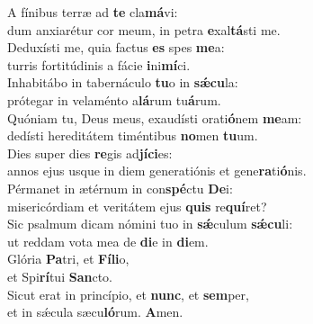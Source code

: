 \evenverse A fínibus terræ ad \textbf{te} cla\textbf{má}vi:~\*\\
\evenverse dum anxiarétur cor meum, in petra \textbf{e}xal\textbf{tá}sti me.\\
\oddverse Deduxísti me, quia factus \textbf{es} spes \textbf{me}a:~\*\\
\oddverse turris fortitúdinis a fácie \textbf{i}ni\textbf{mí}ci.\\
\evenverse Inhabitábo in tabernáculo \textbf{tu}o in \textbf{sǽ}\textbf{cu}la:~\*\\
\evenverse prótegar in velaménto a\textbf{lá}rum tu\textbf{á}rum.\\
\oddverse Quóniam tu, Deus meus, exaudísti orati\textbf{ó}nem \textbf{me}am:~\*\\
\oddverse dedísti hereditátem timéntibus \textbf{no}men \textbf{tu}um.\\
\evenverse Dies super dies \textbf{re}gis ad\textbf{jí}\textbf{ci}es:~\*\\
\evenverse annos ejus usque in diem generatiónis et gene\textbf{ra}ti\textbf{ó}nis.\\
\oddverse Pérmanet in ætérnum in con\textbf{spé}ctu \textbf{De}i:~\*\\
\oddverse misericórdiam et veritátem ejus \textbf{quis} re\textbf{quí}ret?\\
\evenverse Sic psalmum dicam nómini tuo in \textbf{sǽ}culum \textbf{sǽ}\textbf{cu}li:~\*\\
\evenverse ut reddam vota mea de \textbf{di}e in \textbf{di}em.\\
\oddverse Glória \textbf{Pa}tri, et \textbf{Fí}\textbf{li}o,~\*\\
\oddverse et Spi\textbf{rí}tui \textbf{San}cto.\\
\evenverse Sicut erat in princípio, et \textbf{nunc}, et \textbf{sem}per,~\*\\
\evenverse et in sǽcula sæcu\textbf{ló}rum. \textbf{A}men.\\

